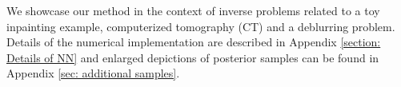 \documentclass[10pt]{article} %
\newcommand{\E}{\mathbb{E}}
\theoremstyle{plain}
\newtheorem{lemma}[theorem]{Lemma}
\theoremstyle{definition}
\theoremstyle{remark}
\newtheorem{remark}[theorem]{Remark}
\newcommand{\norm}[1]{\left\|#1\right\|}
\newcommand{\C}{\mathcal C}
\begin{document}





We showcase our method in the context of inverse problems related to a toy inpainting example, computerized tomography (CT) and a deblurring problem. Details of the numerical implementation are described in Appendix \ref{section: Details of NN} and enlarged depictions of posterior samples can be found in Appendix \ref{sec: additional samples}.
\end{document}
